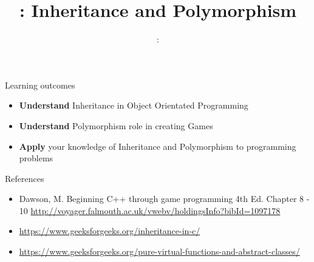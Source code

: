 \usepackage{../../beamerthemeFalmouthGamesAcademy}
\usepackage{multimedia}
\graphicspath{ {../../} }


\usepackage[normalem]{ulem}
\usepackage{wasysym}
\usepackage{listings}
\usepackage{pdfpages}

\usetikzlibrary{arrows,automata}




\title{\sessionnumber: Inheritance and Polymorphism}
\subtitle{\modulecode: \moduletitle}

\frame{\titlepage}

\begin{frame}{Learning outcomes}
	\begin{itemize}
		\item \textbf{Understand} Inheritance in Object Orientated Programming
		\item \textbf{Understand} Polymorphism role in creating Games
		\item \textbf{Apply} your knowledge of Inheritance and Polymorphism to programming problems
	\end{itemize}
\end{frame}







\begin{frame}{References}
	\begin{itemize}
		\item Dawson, M. Beginning C++ through game programming 4th Ed. Chapter 8 - 10 \url{http://voyager.falmouth.ac.uk/vwebv/holdingsInfo?bibId=1097178}
		\item \url{https://www.geeksforgeeks.org/inheritance-in-c/}
		\item \url{https://www.geeksforgeeks.org/pure-virtual-functions-and-abstract-classes/}
	\end{itemize}
\end{frame}



